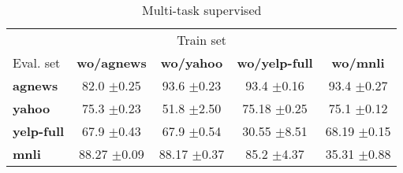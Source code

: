 \begin{table}[h]
	\fontsize{7}{10}
	\selectfont
	\begin{tabular}{lcccc}
		\toprule
		\multicolumn{5}{c}{\tiny Train set} \\
		\tiny Eval. set& \textbf{wo/agnews} & \textbf{wo/yahoo} & \textbf{wo/yelp-full} & \textbf{wo/mnli} \\
		\hline
		\textbf{agnews}    & 82.0 \tiny$\pm$0.25        & 93.6 \tiny$\pm$0.23        & 93.4   \tiny$\pm$0.16          & 93.4 \tiny$\pm$0.27       \\
		\textbf{yahoo}     & 75.3 \tiny$\pm$0.23        & 51.8 \tiny$\pm$2.50        & 75.18   \tiny$\pm$0.25          & 75.1 \tiny$\pm$0.12       \\
		\textbf{yelp-full} & 67.9 \tiny$\pm$0.43        & 67.9 \tiny$\pm$0.54        & 30.55   \tiny$\pm$8.51          & 68.19 \tiny$\pm$0.15       \\
		\textbf{mnli}      & 88.27 \tiny$\pm$0.09        & 88.17 \tiny$\pm$0.37        & 85.2   \tiny$\pm$4.37          & 35.31 \tiny$\pm$0.88      \\
		\bottomrule
	\end{tabular}
	\caption{Multi-task supervised}\label{tab:multi-on-train-set-summary}
\end{table}